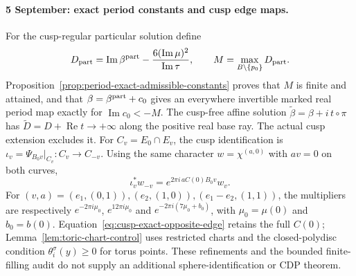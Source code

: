\paragraph{5 September: exact period constants and cusp edge maps.}
For the cusp-regular particular solution define
\[
 D_{\rm part}=\operatorname{Im}\beta^{\rm part}
       -\frac{6(\operatorname{Im}\mu)^2}{\operatorname{Im}\tau},
 \qquad M=\max_{B\setminus\{p_0\}}D_{\rm part}.
\]
Proposition~\ref{prop:period-exact-admissible-constants} proves that
$M$ is finite and attained, and that $\beta=\beta^{\rm part}+c_0$
gives an everywhere invertible marked real period map exactly for
$\operatorname{Im}c_0<-M$. The cusp-free affine solution
$\widetilde\beta=\beta+i\,t\circ\pi$ has
$\widetilde D=D+\operatorname{Re}t\to+\infty$ along the positive
real base ray. The actual cusp extension excludes it.
For $C_v=E_0\cap E_v$, the cusp identification is
$\iota_v=\Psi_{B_0v}|_{C_v}:C_v\to C_{-v}$.
Using the same character $w=\chi^{(a,0)}$ with $av=0$ on both curves,
\[
 \iota_v^*w_{-v}=e^{2\pi i\,aC(0)B_0v}w_v.
\]
For $(v,a)=(e_1,(0,1)),(e_2,(1,0)),(e_1-e_2,(1,1))$, the multipliers
are respectively $e^{-2\pi i\mu_0}$, $e^{12\pi i\mu_0}$ and
$e^{-2\pi i(7\mu_0+b_0)}$, with $\mu_0=\mu(0)$ and $b_0=b(0)$.
Equation~\eqref{eq:cusp-exact-opposite-edge} retains the full $C(0)$;
Lemma~\ref{lem:toric-chart-control} uses restricted charts and the
closed-polydisc condition $\theta_i^\sigma(y)\ge0$ for torus points.
These refinements and the bounded finite-filling audit do not supply
an additional sphere-identification or CDP theorem.

